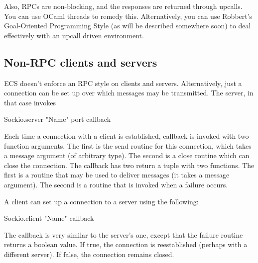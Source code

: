 Also, RPCs are non-blocking, and the responses are returned through upcalls.  You can
use OCaml threads to remedy this.  Alternatively, you can use Robbert's Goal-Oriented
Programming Style (as will be described somewhere soon) to deal effectively with an
upcall driven environment.

\subsection{Non-RPC clients and servers}

ECS doesn't enforce an RPC style on clients and servers.  Alternatively, just a
connection can be set up over which messages may be transmitted.  The server, in
that case invokes

\begin{codebox}
  Sockio.server "Name" port callback
\end{codebox}

Each time a connection with a client is established, callback is invoked with two
function arguments.  The first is the send routine for this connection, which takes a
message argument (of arbitrary type).  The second is a close routine which can close
the connection.  The callback has two return a tuple with two functions.  The first
is a routine that may be used to deliver messages (it takes a message argument).  The
second is a routine that is invoked when a failure occurs.

A client can set up a connection to a server using the following:
\begin{codebox}
  Sockio.client "Name" callback
\end{codebox}

The callback is very similar to the server's one, except that the failure routine
returns a boolean value.  If true, the connection is reestablished (perhaps with a
different server).  If false, the connection remains closed.
